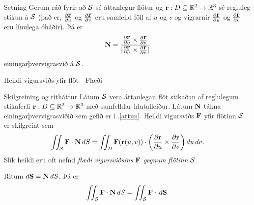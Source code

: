 \begin{frame}{} 

\begin {block}{Setning }
 Gerum ráð fyrir að $\cal S$ sé áttanlegur
flötur og $\mbox{${\bf r}$}:D\subseteq{\mathbb R}^2\rightarrow {\mathbb R}^3$ sé regluleg stikun á
$\cal S$ (það er, $\frac{\partial \mbox{${\bf r}$}}{\partial u}$ og
$\frac{\partial \mbox{${\bf r}$}}{\partial v}$ eru samfelld föll af $u$ og $v$ og 
vigrarnir $\frac{\partial \mbox{${\bf r}$}}{\partial u}$ og
$\frac{\partial \mbox{${\bf r}$}}{\partial v}$ eru línulega óháðir).
Þá er 
$$\mbox{${\bf N}$}=
\frac{\frac{\partial \mbox{${\bf r}$}}{\partial u}\times\frac{\partial
    \mbox{${\bf r}$}}{\partial v}}
{|\frac{\partial \mbox{${\bf r}$}}{\partial u}\times\frac{\partial
    \mbox{${\bf r}$}}{\partial v}|}$$
einingarþvervigrasvið á $\cal S$.  

\end{block}

\end{frame}



\begin{frame}{Heildi vigursviðs yfir flöt - Flæði} 

\begin {block}{Skilgreining og ritháttur \rtask{}}
 Látum $\cal S$ vera áttanlegan flöt stikaðan
af reglulegum stikaferli  $\mbox{${\bf r}$}:D\subseteq{\mathbb R}^2\rightarrow {\mathbb R}^3$ með
samfelldar hlutafleiður.  Látum $\mbox{${\bf N}$}$ tákna einingarþver\-vigrasviðið
sem gefið er í \kaflanr.\ref{attun}.  Heildi vigursviðs $\mbox{${\bf F}$}$ yfir flötinn $\cal S$ er
skilgreint sem 
$$\int\!\!\!\int_{\cal S} \mbox{${\bf F}$}\cdot\mbox{${\bf N}$}\,dS
=\int\!\!\!\int_D \mbox{${\bf F}$}(\mbox{${\bf r}$}(u,v))\cdot \bigg(
\frac{\partial \mbox{${\bf r}$}}{\partial u}\times\frac{\partial \mbox{${\bf r}$}}{\partial
  v}\bigg)\,
du\,dv.$$
Slík heildi eru oft nefnd \emph{flæði vigursviðsins $\mbox{${\bf F}$}$ gegnum flötinn $\cal S$.}

\bigskip
 Ritum $d\mbox{${\bf S}$}=\mbox{${\bf N}$}\,dS$.  Þá  er 
$$\int\!\!\!\int_{\cal S} \mbox{${\bf F}$}\cdot\mbox{${\bf N}$}\,dS=\int\!\!\!\int_{\cal S} \mbox{${\bf F}$}\cdot\,d\mbox{${\bf S}$}.$$
\end{block}

\end{frame}




